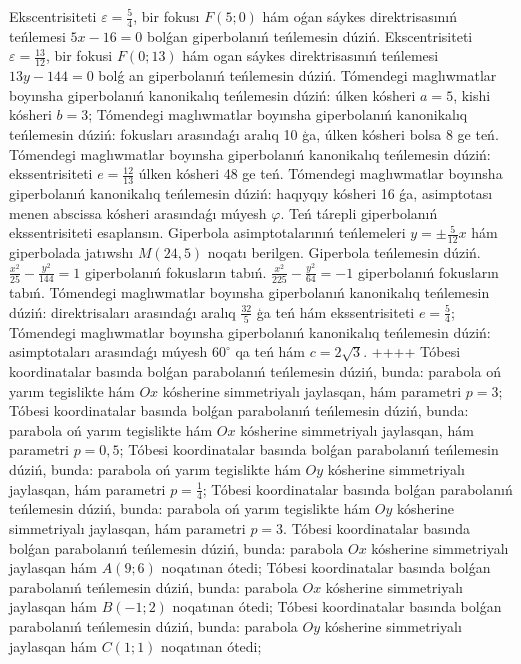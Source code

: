 Ekscentrisiteti $\varepsilon=\frac{5}{4}$, bir fokusı $F (5; 0) $ hám oǵan sáykes direktrisasınıń teńlemesi $5x-16=0$ bolǵan giperbolanıń teńlemesin dúziń.
Ekscentrisiteti $\varepsilon=\frac{13}{12}$, bir fokusi $F (0; 13) $ hám ogan sáykes direktrisasınıń teńlemesi $13 y-144=0$ bolǵ an giperbolanıń teńlemesin dúziń.
Tómendegi maglıwmatlar boyınsha giperbolanıń kanonikalıq teńlemesin dúziń: úlken kósheri $a=5$, kishi kósheri $b=3$;
Tómendegi maglıwmatlar boyınsha giperbolanıń kanonikalıq teńlemesin dúziń: fokusları arasındaǵı aralıq 10 ģa, úlken kósheri bolsa 8 ge teń.
Tómendegi maglıwmatlar boyınsha giperbolanıń kanonikalıq teńlemesin dúziń: ekssentrisiteti $e=\frac{12}{13}$ úlken kósheri 48 ge teń.
Tómendegi maglıwmatlar boyınsha giperbolanıń kanonikalıq teńlemesin dúziń: haqıyqıy kósheri 16 ǵa, asimptotası menen abscissa kósheri arasındaǵı múyesh $\varphi$.
Teń tárepli giperbolanıń ekssentrisiteti esaplansın.
Giperbola asimptotalarınıń teńlemeleri $y= \pm \frac{5}{12} x$ hám giperbolada jatıwshı $M (24,5) $ noqatı berilgen. Giperbola teńlemesin dúziń.
$\frac{x^2}{25}-\frac{y^2}{144}=1$ giperbolanıń fokusların tabıń.
$\frac{x^2}{225}-\frac{y^2}{64}=-1$ giperbolanıń fokusların tabıń.
Tómendegi maglıwmatlar boyınsha giperbolanıń kanonikalıq teńlemesin dúziń: direktrisaları arasındaǵı aralıq $\frac{32}{5}$ ģa teń hám ekssentrisiteti $e=\frac{5}{4}$;
Tómendegi maglıwmatlar boyınsha giperbolanıń kanonikalıq teńlemesin dúziń: asimptotaları arasındaǵı múyesh $60^{\circ}$ qa teń hám $c=2 \sqrt{3}$.
++++
Tóbesi koordinatalar basında bolǵan parabolanıń teńlemesin dúziń, bunda: parabola oń yarım tegislikte hám $Ox$ kósherine simmetriyalı jaylasqan, hám parametri $p=3$;
Tóbesi koordinatalar basında bolǵan parabolanıń teńlemesin dúziń, bunda: parabola oń yarım tegislikte hám $Ox$ kósherine simmetriyalı jaylasqan, hám parametri $p=0,5$;
Tóbesi koordinatalar basında bolǵan parabolanıń teńlemesin dúziń, bunda: parabola oń yarım tegislikte hám $Oy$ kósherine simmetriyalı jaylasqan, hám parametri $p=\frac{1}{4}$;
Tóbesi koordinatalar basında bolǵan parabolanıń teńlemesin dúziń, bunda: parabola oń yarım tegislikte hám $Oy$ kósherine simmetriyalı jaylasqan, hám parametri $p=3$.
Tóbesi koordinatalar basında bolǵan parabolanıń teńlemesin dúziń, bunda: parabola $Ox$ kósherine simmetriyalı jaylasqan hám $A (9; 6) $ noqatınan ótedi;
Tóbesi koordinatalar basında bolǵan parabolanıń teńlemesin dúziń, bunda: parabola $Ox$ kósherine simmetriyalı jaylasqan hám $B (-1; 2) $ noqatınan ótedi;
Tóbesi koordinatalar basında bolǵan parabolanıń teńlemesin dúziń, bunda: parabola $Oy$ kósherine simmetriyalı jaylasqan hám $C (1; 1) $ noqatınan ótedi;
